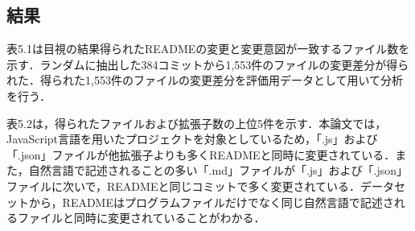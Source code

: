 \documentclass[submit]{ipsj}
\begin{document}



\subsection{結果}
表5.1は目視の結果得られたREADMEの変更と変更意図が一致するファイル数を示す．ランダムに抽出した384コミットから1,553件のファイルの変更差分が得られた．得られた1,553件のファイルの変更差分を評価用データとして用いて分析を行う．

表5.2は，得られたファイルおよび拡張子数の上位5件を示す．本論文では，JavaScript言語を用いたプロジェクトを対象としているため，「.js」および「.json」ファイルが他拡張子よりも多くREADMEと同時に変更されている．また，自然言語で記述されることの多い「.md」ファイルが「.js」および「.json」ファイルに次いで，READMEと同じコミットで多く変更されている．データセットから，READMEはプログラムファイルだけでなく同じ自然言語で記述されるファイルと同時に変更されていることがわかる．










%
\end{document}
